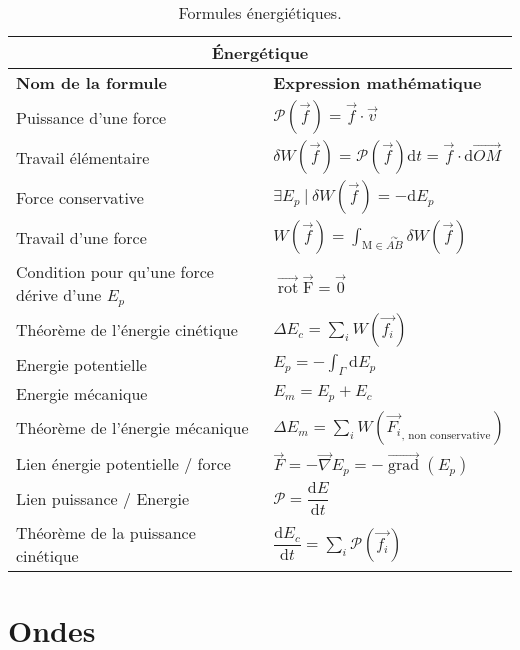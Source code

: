 \documentclass[10pt,a4paper,titlepage,portrait]{article}
\renewcommand{\d}
{
    \mathrm{d}
}
\newcommand*{\dv}[2]
{
    \dfrac{\d#1}{\d#2}
}
\newcommand{\rot}
{
    \vec{\operatorname{rot}}
}
\newcommand{\grad}
{
    \vec{\operatorname{grad}}
}
\renewcommand{\arraystretch}{2}
\begin{document}
\begin{center}
\begin{table}[H]
    \centering
    \renewcommand{\arraystretch}{1.5} %
    \setlength{\tabcolsep}{8pt} %
    \begin{tabular}{@{}p{9cm}p{10cm}@{}}
        \toprule
        \multicolumn{2}{c}{\textbf{Énergétique}} \\
        \midrule
        \textbf{Nom de la formule} & \textbf{Expression mathématique} \\
        \midrule
    Puissance d'une force & $\mathcal{P}(\vec{f}) = \vec{f} \cdot \vec{v}$ \\ 
    Travail élémentaire & $\delta W(\vec{f}) = \mathcal{P}(\vec{f})\text{d}t=\vec{f}\cdot \text{d}\vec{OM}$ \\ 
    Force conservative & $\exists E_{p} \ | \ \delta W(\vec{f}) = -\text{d}E_{p}$ \\ 
    Travail d'une force & $\displaystyle W(\vec{f}) = \int_{\text{M}\in\overset{\curvearrowright}{AB}}\delta W(\vec{f})$ \\ 
    Condition pour qu'une force dérive d'une $E_p$ & $\rot{\vec{\text{F}}} = \vec{0}$ \\ 
    Théorème de l'énergie cinétique & $\displaystyle \Delta E_c = \sum\limits_{i}W(\vec{f_i})$ \\ 
    Energie potentielle & $\displaystyle E_p = -\int_{\Gamma}\text{d}E_p$ \\ 
    Energie mécanique & $E_m = E_p + E_c$ \\ 
    Théorème de l'énergie mécanique & $\displaystyle \Delta E_m = \sum_{i}W(\vec{F_i}_{\text{, non conservative}})$ \\ 
    Lien énergie potentielle / force & $\vec{F} = -\vec{\nabla} E_p = -\grad(E_p)$ \\ 
    Lien puissance / Energie & $\mathcal{P} = \dv{E}{t}$ \\ 
    Théorème de la puissance cinétique & $\displaystyle \dv{E_c}{t} = \sum_{i}\mathcal{P}(\vec{f_i})$ \\ 
    \bottomrule
\end{tabular}
\caption{Formules énergiétiques.}
\label{tab:energetique}
\end{table}


\section{Ondes}


\end{center}
\end{document}
